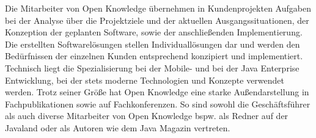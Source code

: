 Die Mitarbeiter von Open Knowledge übernehmen in Kundenprojekten Aufgaben bei der Analyse über die Projektziele und der aktuellen Ausgangssituationen, der Konzeption der geplanten Software, sowie der anschließenden Implementierung. Die erstellten Softwarelösungen stellen Individuallösungen dar und werden den Bedürfnissen der einzelnen Kunden entsprechend konzipiert und implementiert. Technisch liegt die Spezialisierung bei der Mobile- und bei der Java Enterprise Entwicklung, bei der stets moderne Technologien und Konzepte verwendet werden. Trotz seiner Größe hat Open Knowledge eine starke Außendarstellung in Fachpublikationen sowie auf Fachkonferenzen. So sind sowohl die Geschäftsführer als auch diverse Mitarbeiter von Open Knowledge bspw. als Redner auf der Javaland oder als Autoren wie dem Java Magazin vertreten.

\pagebreak
